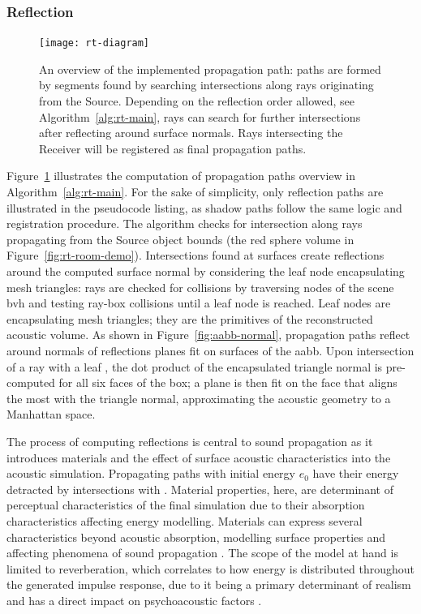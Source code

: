 \subsubsection{Reflection}
\begin{figure}[h]
    \centering
    \texttt{[image: rt-diagram]}
    \caption[Ray Tracing --- propagation diagram]{An overview of the implemented propagation path: paths are formed by segments found by searching intersections along rays originating from the Source. Depending on the reflection order allowed, see Algorithm~\ref{alg:rt-main}, rays can search for further intersections after reflecting around surface normals. Rays intersecting the Receiver will be registered as final propagation paths.}
\label{fig:rt-reflection-diagram}
\end{figure}
Figure~\ref{fig:rt-reflection-diagram} illustrates the computation of propagation paths overview in Algorithm~\ref{alg:rt-main}. For the sake of simplicity, only reflection paths are illustrated in the pseudocode listing, as shadow paths follow the same logic and registration procedure. The algorithm checks for intersection along rays propagating from the Source object bounds (the red sphere volume in Figure~\ref{fig:rt-room-demo}). Intersections found at surfaces create reflections around the computed surface normal by considering the leaf node  encapsulating mesh triangles: rays are checked for collisions by traversing nodes of the scene \acrshort{bvh} and testing ray-box collisions until a leaf node is reached. Leaf nodes are  encapsulating mesh triangles; they are the primitives of the reconstructed acoustic volume. As shown in Figure~\ref{fig:aabb-normal}, propagation paths reflect around normals of reflections planes fit on surfaces of the \acrshort{aabb}. Upon intersection of a ray with a leaf , the dot product of the encapsulated triangle normal is pre-computed for all six faces of the box; a plane is then fit on the face that aligns the most with the triangle normal, approximating the acoustic geometry to a Manhattan space.\par
The process of computing reflections is central to sound propagation as it introduces materials and the effect of surface acoustic characteristics into the acoustic simulation. Propagating paths with initial energy $e_0$ have their energy detracted by intersections with . Material properties, here, are determinant of perceptual characteristics of the final simulation due to their absorption characteristics affecting energy modelling. Materials can express several characteristics beyond acoustic absorption, modelling surface properties and affecting phenomena of sound propagation \citep{kuttruff2016room}. The scope of the model at hand is limited to reverberation, which correlates to how energy is distributed throughout the generated impulse response, due to it being a primary determinant of realism and has a direct impact on psychoacoustic factors \citep{liu2022sound, rungta2016psychoacoustic}.\par

